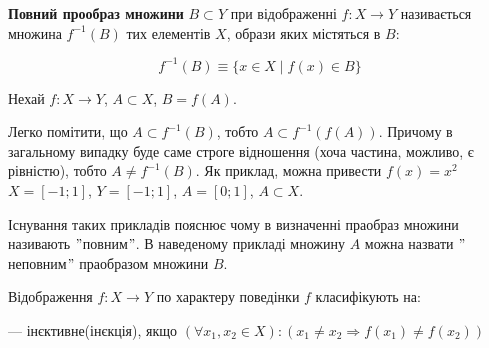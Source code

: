 \begin{definition}
    \textbf{Повний прообраз множини} $B \subset Y$ при відображенні $f: X \rightarrow Y$ 
    називається множина $f^{-1}(B)$ тих елементів $X$, образи яких містяться в $B$:

    $$f^{-1}(B) \equiv \{x \in X \mid f(x) \in B\}$$
\end{definition}

\begin{center}
\end{center}

\begin{remark}
    Нехай $f: X \rightarrow Y$, $A \subset X$, $B = f(A)$.

    Легко помітити, що $A \subset f^{-1}(B)$, тобто $A \subset f^{-1}(f(A))$.
    Причому в загальному випадку буде саме строге відношення (хоча частина, можливо,
    є рівністю), тобто $A \neq f^{-1}(B)$. Як приклад, можна привести $f(x) = x^2$
    $X = [-1;1]$, $Y = [-1;1]$, $A = [0;1]$, $A \subset X$.
\end{remark}

Існування таких прикладів пояснює чому в визначенні праобраз множини називають
$"$повним$"$. В наведеному прикладі множину $A$ можна назвати $"$неповним$"$ праобразом
множини $B$.

Відображення $f: X \rightarrow Y$ по характеру поведінки $f$ класифікують на:

--- інєктивне(інєкція), якщо $(\forall x_1, x_2 \in X): (x_1 \neq x_2 \Rightarrow f(x_1) \neq f(x_2))$

